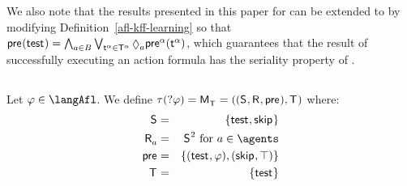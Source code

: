 We also note that the results presented in this paper for \classKFF{} can be extended to \classKD{} by modifying Definition~\ref{afl-kff-learning} so that $\aPrecondition(\aStateTest) = \bigwedge_{\agentA \in \agentsB} \bigvee_{\aStateT[\alpha] \in \aStatesT[\alpha]} \possible[\agentA] \aPrecondition[\alpha](\aStateT[\alpha])$, which guarantees that the result of successfully executing an action formula has the seriality property of \classKD{}.

\subsection{\classS{}}

\begin{definition}[Test]\label{afl-s-test}
Let $\phi \in \langAfl$. 
We define $\tau(\test{\phi}) = \aPModel{\aStatesT} = \aPModelTuple{\aStatesT}$ where:
\begin{eqnarray*}
    \aStates &=& \{\aStateTest, \aStateSkip\}\\
    \aAccessibility{\agentA} &=& \aStates^2 \text{ for } \agentA \in \agents\\
    \aPrecondition &=& \{(\aStateTest, \phi), (\aStateSkip, \top)\}\\
    \aStatesT &=& \{\aStateTest\}
\end{eqnarray*}
\end{definition}

